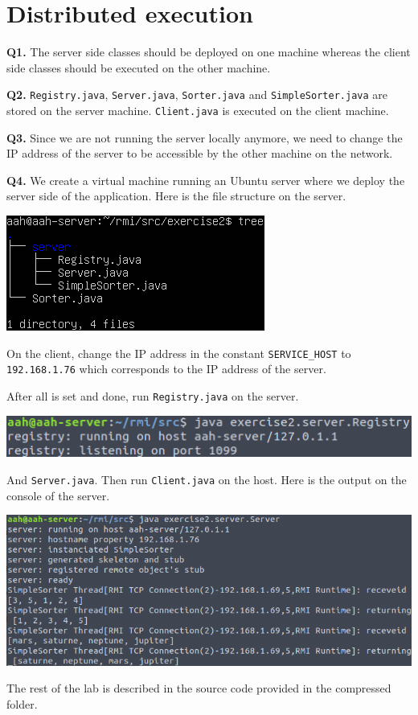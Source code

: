 \documentclass[12pt]{extarticle}
\begin{document}
\section{Distributed execution}
\textbf{Q1.} The server side classes should be deployed on one machine whereas the client side classes should be executed on the other machine.

\textbf{Q2.} \texttt{Registry.java}, \texttt{Server.java}, \texttt{Sorter.java} and \texttt{SimpleSorter.java} are stored on the server machine. \texttt{Client.java} is executed on the client machine.

\textbf{Q3.} Since we are not running the server locally anymore, we need to change the IP address of the server to be accessible by the other machine on the network.

\textbf{Q4.} We create a virtual machine running an Ubuntu server where we deploy the server side of the application. Here is the file structure on the server.
\begin{center}
\includegraphics[scale=0.7]{resources/2-4-1.png}
\end{center}
On the client, change the IP address in the constant \texttt{SERVICE\_HOST} to \texttt{192.168.1.76} which corresponds to the IP address of the server.

After all is set and done, run \texttt{Registry.java} on the server.
\begin{center}
\includegraphics[scale=0.7]{resources/2-4-3.png}
\end{center}
And \texttt{Server.java}. Then run \texttt{Client.java} on the host. Here is the output on the console of the server.
\begin{center}
\includegraphics[scale=0.5]{resources/2-4-2.png}
\end{center}

The rest of the lab is described in the source code provided in the compressed folder.
\end{document}
